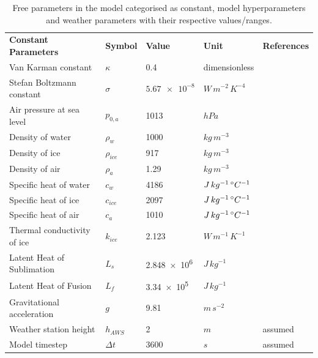 \documentclass[tc, manuscript]{copernicus}
\begin{document}
\begin{table}
  \caption{Free parameters in the model categorised as constant, model hyperparameters and weather 
  parameters with their respective values/ranges.}

	\label{tab:parameters}
	\begin{tabular}{lllll}
		\toprule

		\textbf{Constant Parameters}                       & \textbf{Symbol} & \textbf{Value} &
    \textbf{Unit} & \textbf{References} \\
    Van Karman constant & $\kappa$      & 0.4        &dimensionless & \citet{cuffeyPhysicsGlaciers2010}              \\
    Stefan Boltzmann constant & $\sigma$ & $\num{5.67 e-8} $& $W\, m^{-2}\, K^{-4}$ & \citet{cuffeyPhysicsGlaciers2010}\\
    Air pressure at sea level & $p_{0,a}$ & 1013 & $hPa$  & \citet{molgAblationAssociatedEnergy2004}\\
    Density of water & $\rho_{w}$ & 1000 & $kg\, m^{-3}$    & \citet{cuffeyPhysicsGlaciers2010}\\
    Density of ice & $\rho_{ice}$ & 917 & $kg\, m^{-3}$ & \citet{cuffeyPhysicsGlaciers2010}\\
    Density of air & $\rho_{a}$ &  1.29 & $kg\, m^{-3}$   & \citet{molgAblationAssociatedEnergy2004}\\
    Specific heat of water & $c_{w}$ & 4186 & $J\, kg^{-1}\,^{\circ} C^{-1}$  & \citet{cuffeyPhysicsGlaciers2010}\\
    Specific heat of ice & $c_{ice}$ & 2097 & $J\, kg^{-1}\,^{\circ} C^{-1}$ & \citet{cuffeyPhysicsGlaciers2010}\\
    Specific heat of air & $c_{a}$ & 1010 & $J\, kg^{-1}\,^{\circ} C^{-1}$ & \citet{molgAblationAssociatedEnergy2004}\\
    Thermal conductivity of ice & $k_{ice}$ & 2.123  & $W\, m^{-1}\, K^{-1}$ & \citet{bonalesThermalConductivityIce2017} \\
    Latent Heat of Sublimation & $L_{s}$ & \num{2.848e6}  & $J\, kg^{-1}$ &   \citet{cuffeyPhysicsGlaciers2010}\\
    Latent Heat of Fusion & $L_{f}$ & \num{3.34e5} & $J\, kg^{-1}$ & \citet{cuffeyPhysicsGlaciers2010}\\
    Gravitational acceleration & $g$ & 9.81 & $m\, s^{-2}$ &\citet{cuffeyPhysicsGlaciers2010}\\
    Weather station height & $h_{AWS}$ & 2 & $m$ & assumed \\
    Model timestep                            & $\Delta t$            & $3600$           & $s$ & assumed \\\midrule


\end{tabular}
\end{table}
\end{document}
